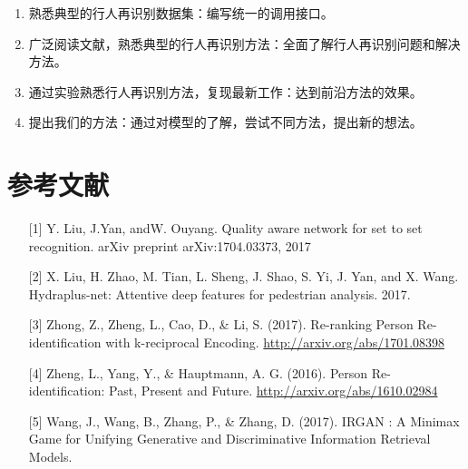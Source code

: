 \begin{enumerate}
	\item 熟悉典型的行人再识别数据集：编写统一的调用接口。
	\item 广泛阅读文献，熟悉典型的行人再识别方法：全面了解行人再识别问题和解决方法。
	\item 通过实验熟悉行人再识别方法，复现最新工作：达到前沿方法的效果。
	\item 提出我们的方法：通过对模型的了解，尝试不同方法，提出新的想法。
\end{enumerate}

{
\section{参考文献}
}

\begin{itemize}
	\item [{[}1{]}] Y. Liu, J.Yan, andW. Ouyang. Quality aware network for set to set recognition. arXiv preprint arXiv:1704.03373, 2017
	\item [{[}2{]}] X. Liu, H. Zhao, M. Tian, L. Sheng, J. Shao, S. Yi, J. Yan, and X. Wang. Hydraplus-net: Attentive deep features for pedestrian analysis. 2017.
	\item [{[}3{]}] Zhong, Z., Zheng, L., Cao, D., \& Li, S. (2017). Re-ranking Person Re-identification with k-reciprocal Encoding. \url{http://arxiv.org/abs/1701.08398}
	\item [{[}4{]}] Zheng, L., Yang, Y., \& Hauptmann, A. G. (2016). Person Re-identification: Past, Present and Future. \url{http://arxiv.org/abs/1610.02984}
	\item [{[}5{]}] Wang, J., Wang, B., Zhang, P., \& Zhang, D. (2017). IRGAN : A Minimax Game for Unifying Generative and Discriminative Information Retrieval Models.
\end{itemize}


